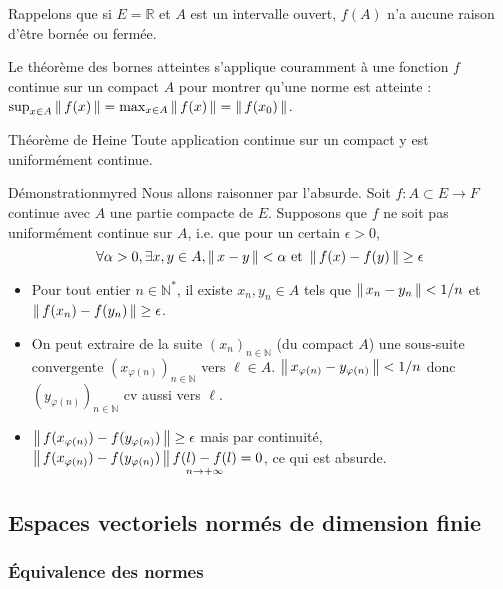     Rappelons que si $E = \mathbb{R}$ et $A$ est un intervalle ouvert, $f(A)$ n’a aucune raison d’être bornée ou fermée.

    Le théorème des bornes atteintes s’applique couramment à une fonction $f$ continue sur un compact $A$ pour montrer qu’une norme est atteinte : $\sup_{x \in A} \left\lVert\,f(x)\,\right\rVert = \max_{x \in A} \left\lVert\,f(x)\,\right\rVert = \left\lVert\,f(x_0)\,\right\rVert$.

    \begin{theo}{Théorème de Heine}{}
        Toute application continue sur un compact y est uniformément continue.
    \end{theo}

    \begin{demo}{Démonstration}{myred}
        Nous allons raisonner par l’absurde. Soit $f : A \subset E \rightarrow F$ continue avec $A$ une partie compacte de $E$. Supposons que $f$ ne soit pas uniformément continue sur $A$, i.e. que pour un certain $\epsilon > 0$, 
        \[ \forall \alpha > 0, \exists x,y \in A, \left\lVert\,x-y\,\right\rVert < \alpha \text{ et } \left\lVert\,f(x) - f(y)\,\right\rVert \geq \epsilon \] 
        \begin{itemize}
            \item Pour tout entier $n \in \mathbb{N}^*$, il existe $x_n, y_n \in A$ tels que $\left\lVert\,x_n - y_n\,\right\rVert < 1/n$ et $\left\lVert\,f(x_n) - f(y_n)\,\right\rVert \geq \epsilon$.
            \item On peut extraire de la suite $(x_n)_{n \in \mathbb{N}}$ (du compact $A$) une sous-suite convergente $\left(x_{\varphi(n)}\right)_{n \in \mathbb{N}}$ vers $\ell \in A$. $\left\lVert\,x_{\varphi(n)} - y_{\varphi(n)}\,\right\rVert < 1/n$ donc $\left(y_{\varphi(n)}\right)_{n \in \mathbb{N}}$ cv aussi vers $\ell$.
            \item $\left\lVert\,f(x_{\varphi(n)}) - f(y_{\varphi(n)})\,\right\rVert \geq \epsilon$ mais par continuité, $\left\lVert\,f(x_{\varphi(n)}) - f(y_{\varphi(n)})\,\right\rVert \underset{n \rightarrow + \infty}{f(l)-f(l)} = 0$, ce qui est absurde.
        \end{itemize}
    \end{demo}

\subsection{Espaces vectoriels normés de dimension finie}

    \subsubsection{Équivalence des normes}

